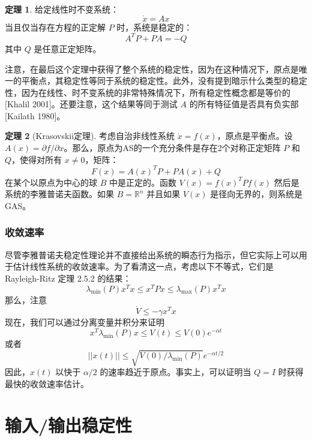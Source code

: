 \documentclass[UTF8,12pt,a4paper]{ctexart}
\theoremstyle{definition}
\newtheorem{theorem}{定理}[section]
\begin{document}
\begin{theorem}
给定线性时不变系统：
\[
\dot{x} = Ax
\]
当且仅当存在方程的正定解 $P$ 时，系统是稳定的：
\[
A^T P + PA = -Q
\]
其中 $Q$ 是任意正定矩阵。
\end{theorem}

注意，在最后这个定理中获得了整个系统的稳定性，因为在这种情况下，原点是唯一的平衡点，其稳定性等同于系统的稳定性。此外，没有提到暗示什么类型的稳定性，因为在线性、时不变系统的非常特殊情况下，所有稳定性概念都是等价的[Khalil 2001]。还要注意，这个结果等同于测试 $A$ 的所有特征值是否具有负实部[Kailath 1980]。

\begin{theorem}[Krasovskii定理]
考虑自治非线性系统 $\dot{x}=f(x)$，原点是平衡点。设 $A(x)=\partial f/\partial x$。那么，原点为AS的一个充分条件是存在2个对称正定矩阵 $P$ 和 $Q$，使得对所有 $x \neq 0$，矩阵：
\[
F(x) = A(x)^T P + PA(x) + Q
\]
在某个以原点为中心的球 $B$ 中是正定的。函数 $V(x)=f(x)^T P f(x)$ 然后是系统的李雅普诺夫函数。如果 $B=\mathbb{R}^n$ 并且如果 $V(x)$ 是径向无界的，则系统是GAS。
\end{theorem}

\subsubsection{收敛速率}

尽管李雅普诺夫稳定性理论并不直接给出系统的瞬态行为指示，但它实际上可以用于估计线性系统的收敛速率。为了看清这一点，考虑以下不等式，它们是 Rayleigh-Ritz 定理 2.5.2 的结果：
\begin{equation}\label{eq:2.7.2}
\lambda_{\min}(P) x^T x \leq x^T P x \leq \lambda_{\max}(P) x^T x
\end{equation}
那么，注意
\begin{equation}\label{eq:2.7.3}
\dot{V} \leq -\gamma x^T x
\end{equation}
现在，我们可以通过分离变量并积分来证明
\begin{equation}\label{eq:2.7.4}
x^T \lambda_{\min}(P) x \leq V(t) \leq V(0) e^{-\alpha t}
\end{equation}
或者
\begin{equation}\label{eq:2.7.5}
||x(t)|| \leq \sqrt{V(0)/\lambda_{\min}(P)} e^{-\alpha t/2}
\end{equation}
因此，$x(t)$ 以快于 $\alpha/2$ 的速率趋近于原点。事实上，可以证明当 $Q=I$ 时获得最快的收敛速率估计。

\section{输入/输出稳定性}
\end{document}
